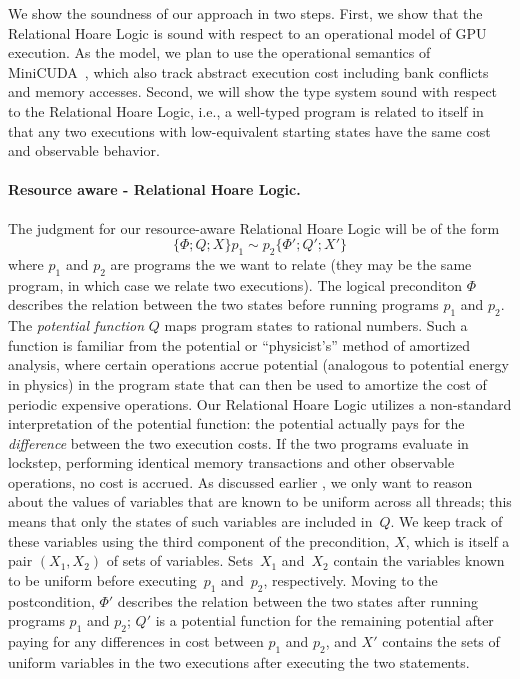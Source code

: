 We show the soundness of our approach in two steps.
%
First, we show that the Relational Hoare Logic is sound with respect to an operational model of GPU execution.
%
As the model, we plan to use the operational semantics of MiniCUDA~\cite{MullerHo21}, which also track abstract execution cost including bank conflicts and memory accesses.
%
Second, we will show the type system sound with respect to the Relational Hoare Logic, i.e., a well-typed program is related to itself in that any two executions with low-equivalent starting states have the same cost and observable behavior.




\paragraph{Resource aware - Relational Hoare Logic.}
The judgment for our resource-aware Relational Hoare Logic will be of the form 
%
\[\{\Phi; Q; X\} p_1 \sim p_2 \{\Phi'; Q'; X'\}\]
%
where $p_1$ and $p_2$ are programs the we want to relate (they may be the same program, in which case we relate two executions).%
The logical preconditon $\Phi$  describes the relation between the two states before running programs $p_1$ and $p_2$. 
%
The {\em potential function} $Q$ maps program states to rational numbers.
%
Such a function is familiar from the potential or ``physicist's'' method of amortized analysis, where certain operations accrue potential (analogous to potential energy in physics) in the program state that can then be used to amortize the cost of periodic expensive operations.
%
Our Relational Hoare Logic utilizes a non-standard interpretation of the potential function: the potential actually pays for the {\em difference} between the two execution costs.
%
If the two programs evaluate in lockstep, performing identical memory transactions and other observable operations, no cost is accrued.
%
As discussed earlier , we only want to reason about the values of variables that are known to be uniform across all threads; this means that only the states of such variables are included in~$Q$.
%
We keep track of these variables using the third component of the precondition, $X$, which is itself a pair $(X_1, X_2)$ of sets of variables.
%
Sets~$X_1$ and~$X_2$ contain the variables known to be uniform before executing~$p_1$ and~$p_2$, respectively.
%
Moving to the postcondition, $\Phi'$ describes the relation between the two states after running programs $p_1$ and $p_2$; $Q'$ is a potential function for the remaining potential after paying for any differences in cost between $p_1$ and $p_2$, and $X'$ contains the sets of uniform variables in the two executions after executing the two statements.

